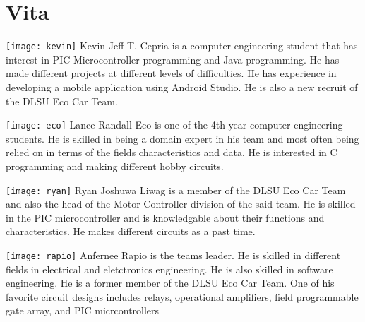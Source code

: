 \chapter{Vita}


{
\vfill

\texttt{[image: kevin]}
Kevin Jeff T. Cepria is a computer engineering student that has interest in PIC Microcontroller programming and Java programming. He has made different projects at different levels of difficulties. He has experience in developing a mobile application using Android Studio. He is also a new recruit of the DLSU Eco Car Team.\vspace{5mm} 


	\texttt{[image: eco]}
	Lance Randall Eco is one of the 4th year computer engineering students. He is skilled in being a domain expert in his team and most often being relied on in terms of the fields characteristics and data. He is interested in C programming and making different hobby circuits.\vspace{5mm} 

\texttt{[image: ryan]}
Ryan Joshuwa Liwag is a member of the DLSU Eco Car Team and also the head of the Motor Controller division of the said team. He is skilled in the PIC microcontroller and is knowledgable about their functions and characteristics. He makes different circuits as a past time.\vspace{5mm} 

\texttt{[image: rapio]}
Anfernee Rapio is the teams leader. He is skilled in different fields in electrical and eletctronics engineering. He is also skilled in software engineering. He is a former member of the DLSU Eco Car Team. One of his favorite circuit designs includes relays, operational amplifiers, field programmable gate array, and PIC micrcontrollers\vspace{5mm} 


}
